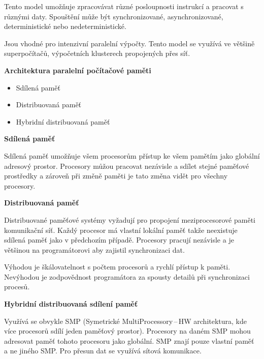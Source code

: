 Tento model umožňuje zpracovávat různé posloupnosti instrukcí a pracovat s různými daty. Spouštění může být synchronizované, asynchronizované, deterministické nebo nedeterministické.

Jsou vhodné pro intenzivní paralelní výpočty. Tento model se využívá ve většině superpočítačů, výpočetních klusterech propojených přes síť.


\begin{Large}\vspace{0,5cm} \textbf{Architektura paralelní počítačové paměti}
\end{Large}

\begin{itemize}
    \item Sdílená paměť
    \item Distribuovaná paměť
    \item Hybridní distribuovaná paměť
\end{itemize}

\begin{large}\vspace{0,5cm} \textbf{Sdílená paměť}
\end{large}

Sdílená paměť umožňuje všem procesorům přístup ke všem pamětím jako globální adresový prostor. Procesory můžou pracovat nezávisle a sdílet stejné paměťové prostředky a zároveň při změně paměti je tato změna vidět pro všechny procesory. 

\begin{large}\vspace{0,5cm} \textbf{Distribuovaná paměť}
\end{large}

Distribuované paměťové systémy vyžadují pro propojení meziprocesorové paměti komunikační síť. Každý procesor má vlastní lokální paměť takže neexistuje sdílená paměť jako v předchozím případě. Procesory pracují nezávisle a je většinou na programátorovi aby zajistil synchronizaci dat.

Výhodou je škálovatelnost s počtem procesorů a rychlí přístup k paměti. Nevýhodou je zodpovědnost programátora za spousty detailů při synchronizaci procesů.

\begin{large}\vspace{0,5cm} \textbf{Hybridní
distribuovaná sdílení paměť}
\end{large}

Využívá se obvykle SMP (Symetrické MultiProcessory\,--\,HW architektura, kde více procesorů sdílí jeden paměťový prostor). Procesory na daném SMP mohou adresovat paměť tohoto procesoru jako globální. SMP znají pouze vlastní paměť a ne jiného SMP. Pro přesun dat se využívá sítová komunikace. 



